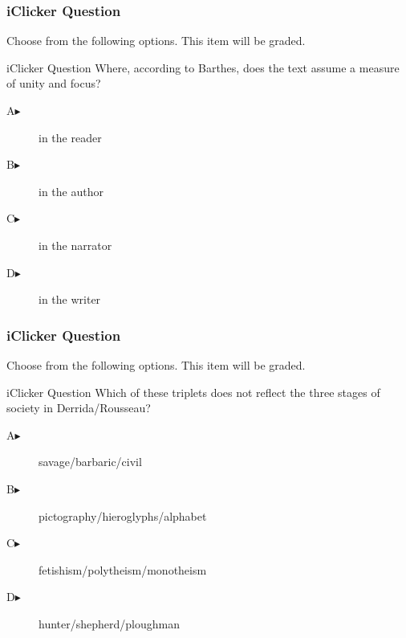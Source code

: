 \documentclass[xcolor=dvipsnames]{beamer}
\begin{document}
\begin{frame}
  \frametitle{iClicker Question}
Choose from the following options. This item will be graded.
\begin{block}{iClicker Question}
Where, according to Barthes, does the text assume a measure of unity
and focus?
\end{block}
\begin{description}
\item[A\hspace{.2in}$\blacktriangleright$] in the reader
\item[B\hspace{.2in}$\blacktriangleright$] in the author
\item[C\hspace{.2in}$\blacktriangleright$] in the narrator
\item[D\hspace{.2in}$\blacktriangleright$] in the writer
\end{description}
\end{frame}

\begin{frame}
  \frametitle{iClicker Question}
Choose from the following options. This item will be graded.
\begin{block}{iClicker Question}
Which of these triplets does not reflect the three stages of society in Derrida/Rousseau?
\end{block}
\begin{description}
\item[A\hspace{.2in}$\blacktriangleright$] savage/barbaric/civil
\item[B\hspace{.2in}$\blacktriangleright$] pictography/hieroglyphs/alphabet
\item[C\hspace{.2in}$\blacktriangleright$] fetishism/polytheism/monotheism
\item[D\hspace{.2in}$\blacktriangleright$] hunter/shepherd/ploughman
\end{description}
\end{frame}
\end{document}
